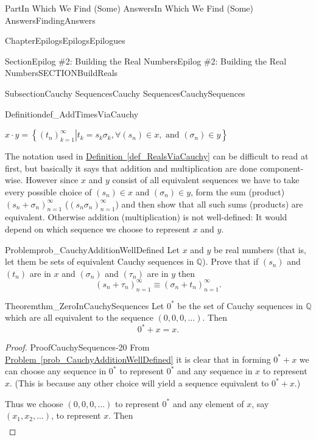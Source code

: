 \documentclass[oneside,10pt,]{book}
\newcommand{\xreffont}{\relax}
\numberwithin{equation}{part}
\newcommand{\QQ}{\mathbb {Q}}
\begin{document}
\begin{partptx}{Part}{In Which We Find (Some) Answers}{}{In Which We Find (Some) Answers}{}{}{FindingAnswers}
\begin{chapterptx}{Chapter}{Epilogs}{}{Epilogs}{}{}{Epilogues}
\begin{sectionptx}{Section}{Epilog \#2: Building the Real Numbers}{}{Epilog \#2: Building the Real Numbers}{}{}{SECTIONBuildReals}
\begin{subsectionptx}{Subsection}{Cauchy Sequences}{}{Cauchy Sequences}{}{}{CauchySequences}
\begin{definition}{Definition}{}{def_AddTimesViaCauchy}
\begin{itemize}[label=\textbullet]
\(\displaystyle x\cdot y = \left\{\left.\left(t_n\right)_{k=1}^\infty \right| t_k = s_k\sigma_k, \forall (s_n) \in x, \text{ and } (\sigma_n)\in y\right\}\)%
\end{itemize}
%
\end{definition}
The notation used in \hyperref[def_RealsViaCauchy]{Definition~{\xreffont\ref{def_RealsViaCauchy}}} can be difficult to read at first, but basically it says that addition and multiplication are done component-wise.  However since \(x\) and \(y\) consist of all equivalent sequences we have to take every possible choice of \((s_n)\in
x\) and \((\sigma_n)\in y\), form the sum (product) \((s_n+\sigma_n)_{n=1}^\infty\) (\((s_n\sigma_n)_{n=1}^\infty\)) and then show that all such sums (products) are equivalent.  Otherwise addition (multiplication) is not well-defined: It would depend on which sequence we choose to represent \(x\) and \(y\).%
\begin{problem}{Problem}{}{prob_CauchyAdditionWellDefined}%
Let \(x\) and \(y\) be real numbers (that is, let them be sets of equivalent Cauchy sequences in \(\QQ\)).  Prove that if \((s_n)\) and \((t_n)\) are in \(x\) and \((\sigma_n)\) and \((\tau_n)\) are in \(y\) then%
\begin{equation*}
(s_n+\tau_n)_{n=1}^\infty \equiv (\sigma_n+t_n)_{n=1}^\infty\text{.}
\end{equation*}
%
\end{problem}
\begin{theorem}{Theorem}{}{}{thm_ZeroInCauchySequences}%
%
%
Let \(0^*\) be the set of Cauchy sequences in \(\QQ\) which are all equivalent to the sequence \((0, 0, 0, \ldots)\).  Then%
\begin{equation*}
0^*+x=x\text{.}
\end{equation*}
%
\end{theorem}
\begin{proof}{Proof}{}{CauchySequences-20}
From \hyperref[prob_CauchyAdditionWellDefined]{Problem~{\xreffont\ref{prob_CauchyAdditionWellDefined}}} it is clear that in forming \(0^*+x\) we can choose any sequence in \(0^*\) to represent \(0^*\) and any sequence in \(x\) to represent \(x\).  (This is because any other choice will yield a sequence equivalent to \(0^*+x\).)%
\par
Thus we choose \((0, 0, 0, \ldots)\) to represent \(0^*\) and any element of \(x\), say \((x_1, x_2,
\ldots)\), to represent \(x\).  Then%
\begin{align*}

\end{align*}
\end{proof}
\end{subsectionptx}
\end{sectionptx}
\end{chapterptx}
\end{partptx}
\end{document}

